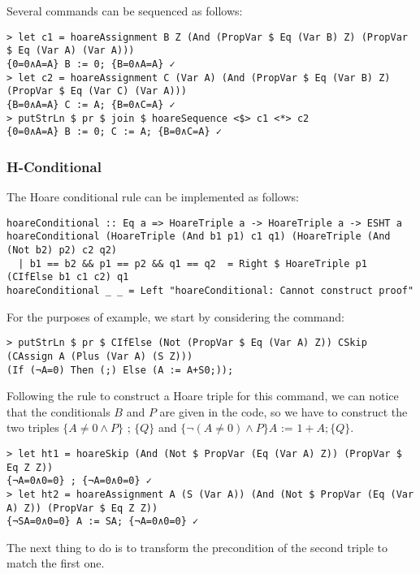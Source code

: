 \documentclass{article}
\begin{document}
Several commands can be sequenced as follows:

\begin{lstlisting}
> let c1 = hoareAssignment B Z (And (PropVar $ Eq (Var B) Z) (PropVar $ Eq (Var A) (Var A)))
{0=0∧A=A} B := 0; {B=0∧A=A} ✓
> let c2 = hoareAssignment C (Var A) (And (PropVar $ Eq (Var B) Z) (PropVar $ Eq (Var C) (Var A)))
{B=0∧A=A} C := A; {B=0∧C=A} ✓
> putStrLn $ pr $ join $ hoareSequence <$> c1 <*> c2
{0=0∧A=A} B := 0; C := A; {B=0∧C=A} ✓
\end{lstlisting}

\subsubsection{H-Conditional}

The Hoare conditional rule can be implemented as follows:

\begin{lstlisting}
hoareConditional :: Eq a => HoareTriple a -> HoareTriple a -> ESHT a
hoareConditional (HoareTriple (And b1 p1) c1 q1) (HoareTriple (And (Not b2) p2) c2 q2)
  | b1 == b2 && p1 == p2 && q1 == q2  = Right $ HoareTriple p1 (CIfElse b1 c1 c2) q1
hoareConditional _ _ = Left "hoareConditional: Cannot construct proof"
\end{lstlisting}

For the purposes of example, we start by considering the command:

\begin{lstlisting}
> putStrLn $ pr $ CIfElse (Not (PropVar $ Eq (Var A) Z)) CSkip (CAssign A (Plus (Var A) (S Z)))
(If (¬A=0) Then (;) Else (A := A+S0;));
\end{lstlisting}

Following the rule to construct a Hoare triple for this command, we can notice that the conditionals $B$ and $P$ are given in the code, so we have to construct the two triples $\{A \neq 0 \land P\} \texttt{ ; } \{Q\}$ and $\{\neg(A \neq 0) \land P\} A \texttt{ := } 1 + A; \{Q\}$.

\begin{lstlisting}
> let ht1 = hoareSkip (And (Not $ PropVar (Eq (Var A) Z)) (PropVar $ Eq Z Z))
{¬A=0∧0=0} ; {¬A=0∧0=0} ✓
> let ht2 = hoareAssignment A (S (Var A)) (And (Not $ PropVar (Eq (Var A) Z)) (PropVar $ Eq Z Z))
{¬SA=0∧0=0} A := SA; {¬A=0∧0=0} ✓
\end{lstlisting}

The next thing to do is to transform the precondition of the second triple to match the first one.
\end{document}
